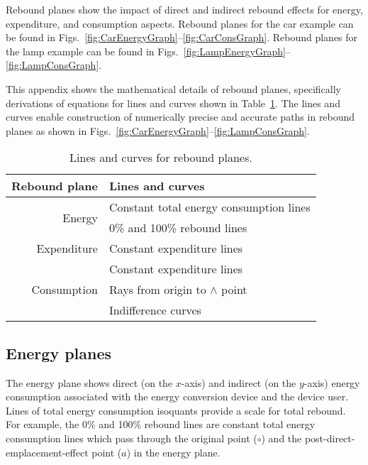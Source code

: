 
Rebound planes show the impact of direct and indirect rebound effects
for energy, expenditure, and consumption aspects.
Rebound planes for the car example can be found in 
Figs.~\ref{fig:CarEnergyGraph}--\ref{fig:CarConsGraph}.
Rebound planes for the lamp example can be found in
Figs.~\ref{fig:LampEnergyGraph}--\ref{fig:LampConsGraph}.

This appendix shows the mathematical details of rebound planes,
specifically derivations of equations for lines and curves 
shown in Table~\ref{tab:lines_and_curves}.
The lines and curves enable construction of numerically precise and accurate
paths in rebound planes
as shown in Figs.~\ref{fig:CarEnergyGraph}--\ref{fig:LampConsGraph}.

\begin{table}
\centering
\caption{Lines and curves for rebound planes.}
\label{tab:lines_and_curves}
\begin{tabular}{rl}
\toprule
Rebound plane                & Lines and curves                        \\ 
\midrule
\multirow{2}{*}{Energy}      & Constant total energy consumption lines \\
                             & 0\% and 100\% rebound lines             \\
\midrule
Expenditure                  & Constant expenditure lines              \\
\midrule
\multirow{3}{*}{Consumption} & Constant expenditure lines              \\
                             & Rays from origin to $\wedge$ point      \\
                             & Indifference curves                     \\
\bottomrule
\end{tabular}
\end{table}


\subsection{Energy planes}
\label{sec:energy_path_graph_details}

The energy plane shows direct (on the $x$-axis) and indirect (on the $y$-axis)
energy consumption associated with the energy conversion device 
and the device user.
Lines of total energy consumption isoquants provide a 
scale for total rebound.
For example, the 0\% and 100\% rebound lines are constant total energy consumption
lines which pass through the original point ($\circ$) and
the post-direct-emplacement-effect point ($a$) 
in the energy plane.

